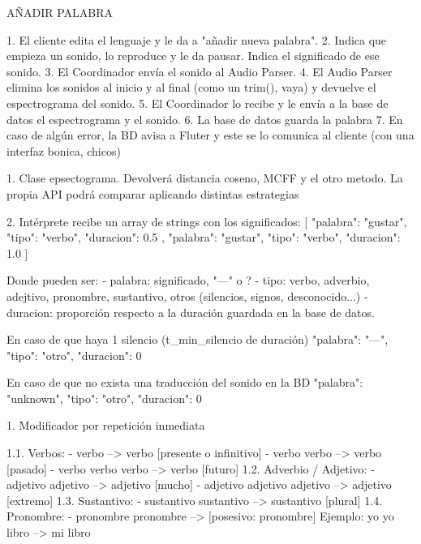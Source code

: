 AÑADIR PALABRA

1. El cliente edita el lenguaje y le da a "añadir nueva palabra".
2. Indica que empieza un sonido, lo reproduce y le da pausar. Indica el significado de ese sonido.
3. El Coordinador envía el sonido al Audio Parser.
4. El Audio Parser elimina los sonidos al inicio y al final (como un trim(), vaya) y devuelve el espectrograma del sonido.
5. El Coordinador lo recibe y le envía a la base de datos el espectrograma y el sonido.
6. La base de datos guarda la palabra
7. En caso de algún error, la BD avisa a Fluter y este se lo comunica al cliente (con una interfaz bonica, chicos)




1. Clase epsectograma. Devolverá distancia coseno, MCFF y el otro metodo. La propia API podrá comparar aplicando distintas estrategias

2. Intérprete recibe un array de strings con los significados:
    [
    {
        "palabra": "gustar",
        "tipo": "verbo",
        "duracion": 0.5
    },
    {
        "palabra": "gustar",
        "tipo": "verbo",
        "duracion": 1.0
    }
    ]

    Donde pueden ser:
        - palabra: significado, "---" o ?
        - tipo: verbo, adverbio, adejtivo, pronombre, sustantivo, otros (silencios, signos, desconocido...)
        - duracion: proporción respecto a la duración guardada en la base de datos.

    En caso de que haya 1 silencio (t_min_silencio de duración)
    {
        "palabra": "---",
        "tipo": "otro",
        "duracion": 0
    }

    En caso de que no exista una traducción del sonido en la BD
    {
        "palabra": "unknown",
        "tipo": "otro",
        "duracion": 0
    }




1. Modificador por repetición inmediata

    1.1. Verbos: 
        - verbo --> verbo [presente o infinitivo]
        - verbo verbo --> verbo [pasado]
        - verbo verbo verbo --> verbo [futuro]
    1.2. Adverbio / Adjetivo:
        - adjetivo adjetivo --> adjetivo [mucho]
        - adjetivo adjetivo adjetivo --> adjetivo [extremo]
    1.3. Sustantivo:
        - sustantivo sustantivo --> sustantivo [plural]
    1.4. Pronombre: 
        - pronombre pronombre --> [posesivo: pronombre]
            Ejemplo: yo yo libro --> mi libro 

